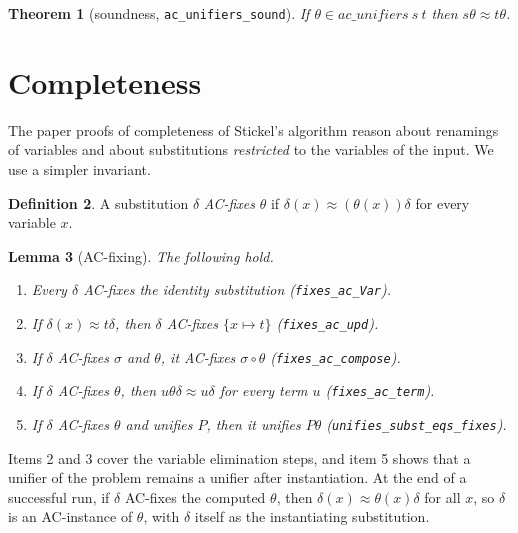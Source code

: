 \documentclass[11pt,a4paper]{article}
\newtheorem{theorem}{Theorem}[section]
\newtheorem{lemma}[theorem]{Lemma}
\theoremstyle{definition}
\newtheorem{definition}[theorem]{Definition}
\theoremstyle{remark}
\newcommand{\isa}[1]{\mbox{\small\texttt{#1}}}
\newcommand{\eqAC}{\approx}
\begin{document}
\begin{theorem}[soundness, \isa{ac\_unifiers\_sound}]
  If $\theta \in \mathit{ac\_unifiers}\ s\ t$ then $s\theta \eqAC t\theta$.
\end{theorem}

\section{Completeness}\label{sec:complete}

The paper proofs of completeness of Stickel's algorithm reason about renamings of variables and
about substitutions \emph{restricted} to the variables of the input. We use a simpler invariant.

\begin{definition}
  A substitution $\delta$ \emph{AC-fixes} $\theta$ if $\delta(x) \eqAC (\theta(x))\delta$ for every
  variable $x$.
\end{definition}

\begin{lemma}[AC-fixing]\label{lem:fixes}
  The following hold.
  \begin{enumerate}[nosep]
    \item Every $\delta$ AC-fixes the identity substitution (\isa{fixes\_ac\_Var}).
    \item If $\delta(x) \eqAC t\delta$, then $\delta$ AC-fixes $\{x \mapsto t\}$
          (\isa{fixes\_ac\_upd}).
    \item If $\delta$ AC-fixes $\sigma$ and $\theta$, it AC-fixes $\sigma\circ\theta$
          (\isa{fixes\_ac\_compose}).
    \item If $\delta$ AC-fixes $\theta$, then $u\theta\delta \eqAC u\delta$ for every term $u$
          (\isa{fixes\_ac\_term}).
    \item If $\delta$ AC-fixes $\theta$ and unifies $P$, then it unifies $P\theta$
          (\isa{unifies\_subst\_eqs\_fixes}).
  \end{enumerate}
\end{lemma}

Items 2 and 3 cover the variable elimination steps, and item 5 shows that a unifier of the
problem remains a unifier after instantiation. At the end of a successful run, if $\delta$
AC-fixes the computed $\theta$, then $\delta(x) \eqAC \theta(x)\delta$ for all $x$, so $\delta$
is an AC-instance of $\theta$, with $\delta$ itself as the instantiating substitution.
\end{document}
